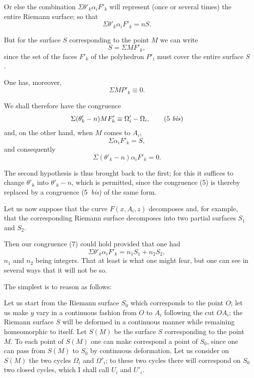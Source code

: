 \documentclass{article}
\begin{document}
Or else the combination $\Sigma \theta'_{k} \alpha_{i}F'_{k}$ will represent (once or several times) the entire Riemann surface; so that
\[ \Sigma \theta'_{k} \alpha_{i}F'_{k} = nS. \]

But for the surface $S$ corresponding to the point $M$ we can write
\[ S = \Sigma MF'_{k}, \]
since the set of the faces $F'_{k}$ of the polyhedron $P'_{i}$ must cover the entire surface $S$.

One has, moreover,
\[ \Sigma MP'_{k} \equiv 0. \]


We shall therefore have the congruence
\[ \Sigma (\theta'_{k} - n) MF'_{k} \equiv \Omega'_{i} - \Omega_{i}, \tag{5 \textit{bis}} \]
and, on the other hand, when $M$ comes to $A_{i}$,
\[ \Sigma \alpha_{i}F'_{k} = S, \]
and consequently
\[ \Sigma (\theta'_{k} - n) \alpha_{i}F'_{k} = 0. \]

The second hypothesis is thus brought back to the first; for this it suffices to change $\theta'_{k}$ into $\theta'_{k} - n$, which is permitted, since the congruence (5) is thereby replaced by a congruence (5~\emph{bis}) of the same form.

Let us now suppose that the curve $F(x, A_{i}, z)$ decomposes and, for example, that the corresponding Riemann surface decomposes into two partial surfaces $S_{1}$ and $S_{2}$.

Then our congruence (7) could hold provided that one had
\[ \Sigma \theta'_{k} \alpha_{i}F'_{k} = n_{1}S_{1} + n_{2}S_{2}, \]
$n_{1}$ and $n_{2}$ being integers. That at least is what one might fear, but one can see in several ways that it will not be so.

The simplest is to reason as follows:

Let us start from the Riemann surface $S_{0}$ which corresponds to the point $O$; let us make $y$ vary in a continuous fashion from $O$ to $A_{i}$ following the cut $OA_{i}$; the Riemann surface $S$ will be deformed in a continuous manner while remaining homeomorphic to itself. Let $S(M)$ be the surface $S$ corresponding to the point $M$. To each point of $S(M)$ one can make correspond a point of $S_{0}$, since one can pass from $S(M)$ to $S_{0}$ by continuous deformation. Let us consider on $S(M)$ the two cycles $\Omega_{i}$ and $\Omega'_{i}$; to these two cycles there will correspond on $S_{0}$ two closed cycles, which I shall call $U_{i}$ and $U'_{i}$.
\end{document}
